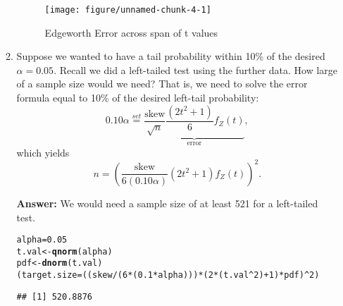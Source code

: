 \documentclass{article}\usepackage[]{graphicx}\usepackage[]{xcolor}
\makeatletter
\def\maxwidth{ %
  \ifdim\Gin@nat@width>\linewidth
    \linewidth
  \else
    \Gin@nat@width
  \fi
}
\newcommand{\hlnum}[1]{\textcolor[rgb]{0.686,0.059,0.569}{#1}}%
\newcommand{\hlopt}[1]{\textcolor[rgb]{0,0,0}{#1}}%
\newcommand{\hldef}[1]{\textcolor[rgb]{0.345,0.345,0.345}{#1}}%
\newcommand{\hlkwb}[1]{\textcolor[rgb]{0.69,0.353,0.396}{#1}}%
\newcommand{\hlkwd}[1]{\textcolor[rgb]{0.737,0.353,0.396}{\textbf{#1}}}%
\newenvironment{kframe}{%
 \def\at@end@of@kframe{}%
 \ifinner\ifhmode%
  \def\at@end@of@kframe{\end{minipage}}%
  \begin{minipage}{\columnwidth}%
 \fi\fi%
 \def\FrameCommand##1{\hskip\@totalleftmargin \hskip-\fboxsep
 \colorbox{shadecolor}{##1}\hskip-\fboxsep
     \hskip-\linewidth \hskip-\@totalleftmargin \hskip\columnwidth}%
 \MakeFramed {\advance\hsize-\width
   \@totalleftmargin\z@ \linewidth\hsize
   \@setminipage}}%
 {\par\unskip\endMakeFramed%
 \at@end@of@kframe}
\newenvironment{knitrout}{}{} %
\makeatother
\begin{document}
\begin{enumerate}
\begin{enumerate}
\begin{figure}[H]
\begin{center}
\begin{knitrout}
\color{fgcolor}
\texttt{[image: figure/unnamed-chunk-4-1]} 
\end{knitrout}
\caption{Edgeworth Error across span of t values}
\label{plot1} 
\end{center}
\end{figure}

  \item Suppose we wanted to have a tail probability within 10\% of the desired
  $\alpha=0.05$. Recall we did a left-tailed test using the further data.
  How large of a sample size would we need? That is, we need
  to solve the error formula equal to 10\% of the desired left-tail probability:
  \[0.10 \alpha  \stackrel{set}{=} \underbrace{\frac{\text{skew}}{\sqrt{n}} \frac{(2t^2+1)}{6} f_Z(t)}_{\textrm{error}},\]
  which yields
  \[ n = \left(\frac{\text{skew}}{6(0.10\alpha)} (2t^2 + 1) f_Z(t)\right)^2.\]

\textbf{Answer: }We would need a sample size of at least 521 for a left-tailed test.
\begin{knitrout}\scriptsize
{}\color{fgcolor}\begin{kframe}
\begin{alltt}
\hldef{alpha} \hlkwb{=} \hlnum{0.05}
\hldef{t.val} \hlkwb{<-} \hlkwd{qnorm}\hldef{(alpha)}
\hldef{pdf} \hlkwb{<-} \hlkwd{dnorm}\hldef{(t.val)}
\hldef{(target.size} \hlkwb{=} \hldef{((skew} \hlopt{/} \hldef{(}\hlnum{6}\hlopt{*}\hldef{(}\hlnum{0.1}\hlopt{*}\hldef{alpha)))} \hlopt{*} \hldef{(}\hlnum{2} \hlopt{*} \hldef{(t.val}\hlopt{^}\hlnum{2}\hldef{)} \hlopt{+} \hlnum{1}\hldef{)} \hlopt{*} \hldef{pdf)}\hlopt{^}\hlnum{2}\hldef{)}
\end{alltt}
\begin{verbatim}
## [1] 520.8876
\end{verbatim}
\end{kframe}
\end{knitrout}


\end{enumerate}
\end{enumerate}
\end{document}
